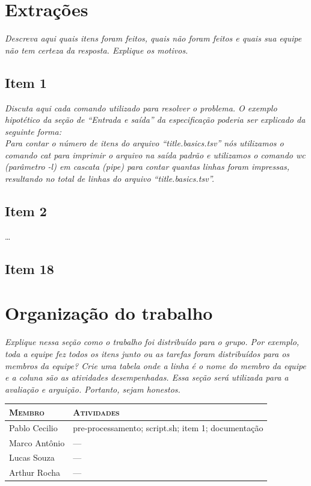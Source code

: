 \documentclass[12pt]{article}
\begin{document}
\section{Extrações}

\emph{Descreva aqui quais itens foram feitos, quais não foram feitos e
quais sua equipe não tem certeza da resposta. Explique os motivos.}

\subsection*{Item 1}

\emph{Discuta aqui cada comando utilizado para resolver o problema. O
exemplo hipotético da seção de ``Entrada e saída'' da especificação
poderia ser explicado da seguinte forma:}\\
\emph{Para contar o número de itens do arquivo ``title.basics.tsv'' nós
utilizamos o comando cat para imprimir o arquivo na saída padrão e
utilizamos o comando wc (parâmetro -l) em cascata (pipe) para contar quantas 
linhas foram impressas, resultando no total de linhas do arquivo
``title.basics.tsv''.}


\subsection*{Item 2}
\ldots

\subsection*{Item 18}

\section{Organização do trabalho}

\emph{Explique nessa seção como o trabalho foi distribuído para o grupo.
Por exemplo, toda a equipe fez todos os itens junto ou as tarefas foram 
distribuídos para os membros da equipe? Crie uma tabela onde a linha é o
nome do membro da equipe e a coluna são as atividades desempenhadas.
Essa seção será utilizada para a avaliação e arguição. Portanto, sejam
honestos.}

\begin{table}[!htb]
    \begin{tabular}{p{5cm}p{7.5cm}}
    
        \textsc{Membro}      & \textsc{Atividades} \\ 
	    \hline
        Pablo Cecilio & pre-processamento; script.sh; item 1; documentação \\ 
        Marco Antônio & ---  \\
        Lucas Souza & ---  \\
        Arthur Rocha & ---  \\

    \end{tabular}
\end{table}
\end{document}
